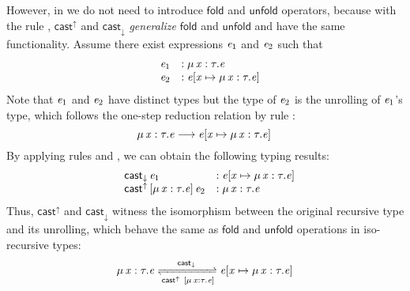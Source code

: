 However, in \name we do not need to introduce $ \mathsf{fold} $ and
$ \mathsf{unfold} $ operators, because with the rule ,
$ \mathsf{cast}^{\uparrow} $ and $ \mathsf{cast}_{\downarrow} $ \emph{generalize} $ \mathsf{fold} $ and
$ \mathsf{unfold} $ and have the same functionality. Assume there exist
expressions $\mathit{e_{{\mathrm{1}}}}$ and $\mathit{e_{{\mathrm{2}}}}$ such that
\[\begin{array}{lll}
	&\mathit{e_{{\mathrm{1}}}} &: \mu \, \mathit{x}  :  \tau  .  \mathit{e}\\
	&\mathit{e_{{\mathrm{2}}}} &: \mathit{e}  [  \mathit{x}  \mapsto  \mu \, \mathit{x}  :  \tau  .  \mathit{e}  ] \,
\end{array}\]
Note that $\mathit{e_{{\mathrm{1}}}}$ and $\mathit{e_{{\mathrm{2}}}}$ have distinct types but the type of
$\mathit{e_{{\mathrm{2}}}}$ is the unrolling of $\mathit{e_{{\mathrm{1}}}}$'s type, which follows the
one-step reduction relation by rule :
\[ \mu \, \mathit{x}  :  \tau  .  \mathit{e}  \longrightarrow  \mathit{e}  [  \mathit{x}  \mapsto  \mu \, \mathit{x}  :  \tau  .  \mathit{e}  ] \, \]
By applying rules  and , we
can obtain the following typing results:
\[\begin{array}{lll}
	&\mathsf{cast}_{\downarrow} \, \mathit{e_{{\mathrm{1}}}} &: \mathit{e}  [  \mathit{x}  \mapsto  \mu \, \mathit{x}  :  \tau  .  \mathit{e}  ] \,\\
	&\mathsf{cast}^{\uparrow} \, [  \mu \, \mathit{x}  :  \tau  .  \mathit{e}  ] \,  \mathit{e_{{\mathrm{2}}}} &: \mu \, \mathit{x}  :  \tau  .  \mathit{e}
\end{array}\]
Thus, $ \mathsf{cast}^{\uparrow} $ and $ \mathsf{cast}_{\downarrow} $ witness the isomorphism between
the original recursive type and its unrolling, which behave the same
as $ \mathsf{fold} $ and $ \mathsf{unfold} $ operations in iso-recursive types:
\begin{align*}
  \mu \, \ottmv{x}  \ottsym{:}  \tau  \ottsym{.}  \ottnt{e} \xrightleftharpoons[{ \mathsf{cast}^{\uparrow} ~[ \mu \, \ottmv{x}  \ottsym{:}  \tau  \ottsym{.}  \ottnt{e}
  ]}]{ \mathsf{cast}_{\downarrow} } \ottnt{e}  \ottsym{[}  \ottmv{x}  \mapsto  \mu \, \ottmv{x}  \ottsym{:}  \tau  \ottsym{.}  \ottnt{e}  \ottsym{]} \,
\end{align*}



